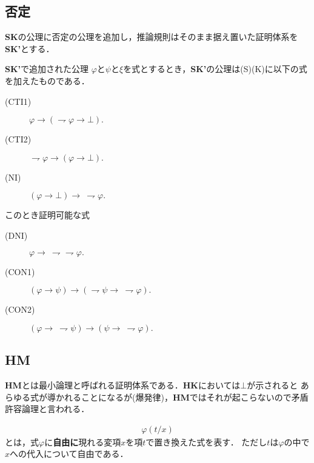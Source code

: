 \subsection{否定}
	{\bf SK}の公理に否定の公理を追加し，推論規則はそのまま据え置いた証明体系を{\bf SK'}とする．
	
	\begin{itembox}[l]{{\bf SK'}で追加された公理}
		$\varphi$と$\psi$と$\xi$を式とするとき，{\bf SK'}の公理は(S)(K)に以下の式を加えたものである．
		\begin{description}
			\item[(CTI1)] $\varphi \rightarrow (\rightharpoondown \varphi \rightarrow \bot).$
			
			\item[(CTI2)] $\rightharpoondown \varphi \rightarrow (\varphi \rightarrow \bot).$
			
			\item[(NI)] $(\varphi \rightarrow \bot) \rightarrow\ \rightharpoondown \varphi.$
		\end{description}
	\end{itembox}
	
	このとき証明可能な式
	\begin{description}
		\item[(DNI)] $\varphi \rightarrow\ \rightharpoondown \rightharpoondown \varphi.$
		\item[(CON1)] $(\varphi \rightarrow \psi) \rightarrow (\rightharpoondown \psi \rightarrow\ \rightharpoondown \varphi).$
		\item[(CON2)] $(\varphi \rightarrow\ \rightharpoondown \psi) \rightarrow (\psi \rightarrow\ \rightharpoondown \varphi).$
	\end{description}
	
\subsection{{\bf HM}}
	{\bf HM}とは最小論理と呼ばれる証明体系である．{\bf HK}においては$\bot$が示されると
	あらゆる式が導かれることになるが(爆発律)，{\bf HM}ではそれが起こらないので矛盾許容論理と言われる．
	
	\begin{align}
		\varphi(t/x)
	\end{align}
	とは，式$\varphi$に{\bf 自由に}現れる変項$x$を項$t$で置き換えた式を表す．
	ただし$t$は$\varphi$の中で$x$への代入について自由である．
	
